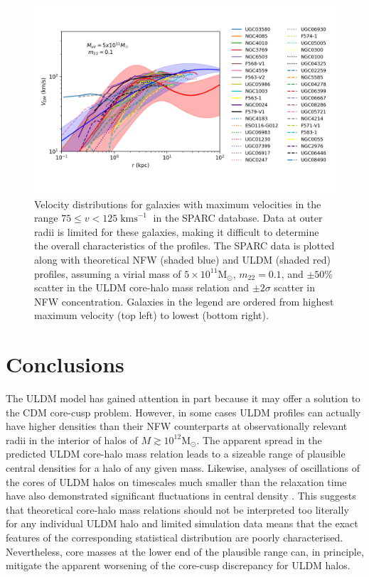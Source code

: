 \documentclass{pasa}%
\begin{document}
\begin{figure}[t]
\centering
\includegraphics[scale=0.9, trim={0.5cm 1cm 0cm 1cm}]{000_vs_SPARC_5_10_11.png}
\caption{Velocity distributions for galaxies with maximum velocities in the range $75 \leq v < 125\operatorname{kms}^{-1}$ in the SPARC database. Data at outer radii is limited for these galaxies, making it difficult to determine the overall characteristics of the profiles. The SPARC data is plotted along with theoretical NFW (shaded blue) and ULDM (shaded red) profiles, assuming a virial mass of $5\times10^{11} \mathrm{M}_{\odot}$, $m_{22} = 0.1$, and $\pm 50 \%$ scatter in the ULDM core-halo mass relation and $\pm2\sigma$ scatter in NFW concentration. Galaxies in the legend are ordered from highest maximum velocity (top left) to lowest (bottom right).}\label{fig:low_v}
\end{figure}



\section{Conclusions}\label{sec:conclusion}

The ULDM model has gained attention in part because it may offer a solution to the CDM core-cusp problem. However, in some cases ULDM profiles can actually have higher densities than their NFW counterparts at observationally relevant radii in the interior of halos of $M \gtrsim 10^{12} \mathrm{M}_{\odot}$. The apparent spread in the predicted ULDM core-halo mass relation \cite{Schive:2014hza} leads to a sizeable range of plausible central densities for a halo of any given mass. Likewise, analyses of oscillations of the cores of ULDM halos on timescales much smaller than the relaxation time have also demonstrated significant fluctuations in central density \cite{Veltmaat:2018dfz}. This suggests that theoretical core-halo mass relations should not be interpreted too literally for any individual ULDM halo and limited simulation data means that the exact features of the corresponding statistical distribution are poorly characterised. Nevertheless, core masses at the lower end of the plausible range can, in principle, mitigate the apparent worsening of the core-cusp discrepancy for ULDM halos.  
\end{document}
